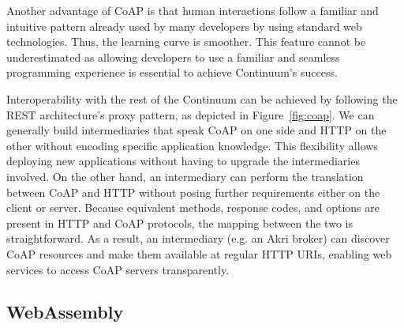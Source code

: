 Another advantage of CoAP is that human interactions follow a familiar and intuitive pattern already used by many developers by using standard web technologies. Thus, the learning curve is smoother. This feature cannot be underestimated as allowing developers to use a familiar and seamless programming experience is essential to achieve Continuum's success.

Interoperability with the rest of the Continuum can be achieved by following the REST architecture's proxy pattern, as depicted in Figure~\ref{fig:coap}. We can generally build intermediaries that speak CoAP on one side and HTTP on the other without encoding specific application knowledge. This flexibility allows deploying new applications without having to upgrade the intermediaries involved. On the other hand, an intermediary can perform the translation between CoAP and HTTP without posing further requirements either on the client or server. Because equivalent methods, response codes, and options are present in HTTP and CoAP protocols, the mapping between the two is straightforward. As a result, an intermediary (e.g. an Akri broker) can discover CoAP resources and make them available at regular HTTP URIs, enabling web services to access CoAP servers transparently.


\subsection{WebAssembly}
\label{sec:webassembly}

